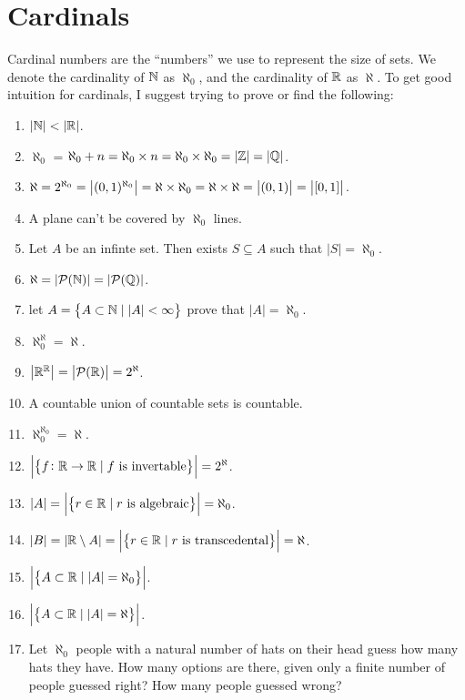 \documentclass[11pt,a4paper]{article}
\begin{document}
\newpage
\section{Cardinals}
Cardinal numbers are the ``numbers'' we use to represent the size of 
sets. We denote the cardinality of $\mathbb{N}$ as $\aleph_0$, and the cardinality
of $\mathbb{R}$ as $\aleph$. To get good intuition for cardinals, I suggest trying 
to prove or find the following:
\begin{enumerate}
    \item $|\mathbb{N}| < |\mathbb{R}|$.
    \item $\aleph_{0}$ = 
    $\aleph_{0} + n = \aleph_0 \times n=\aleph_0\times\aleph_0=|\mathbb{Z}|=|\mathbb{Q}|$.
  \item $\aleph = 2^{\aleph_0} = \left\lvert(0,1)^{\aleph_0}\right\rvert = \aleph\times\aleph_0 
    = \aleph\times\aleph = \left\lvert(0,1)\right\rvert = \left\lvert[0,1]\right\rvert$.
    \item A plane can't be covered by $\aleph_0$ lines.
    \item Let $A$ be an infinte set. Then exists $S \subseteq A$ such
      that $|S| = \aleph_0$.
    \item $\aleph = |\mathcal{P}(\mathbb{N})|= |\mathcal{P}(\mathbb{Q})|$.
    \item let $A = \left\{A \subset \mathbb{N} \mid |A| < \infty\right\}$ prove that
      $|A| = \aleph_0$.
    \item $\aleph^\aleph_0=\aleph$.
    \item $\left\lvert\mathbb{R}^{\mathbb{R}}\right\rvert = \left\lvert\mathcal{P}(\mathbb{R})\right\rvert = 2^\aleph$.
    \item A countable union of countable sets is countable.
    \item $\aleph_0^{\aleph_0} =\aleph$.
    \item $\left\lvert\left\{f \colon \mathbb{R} \to \mathbb{R} \mid f \text{ is invertable}\right\}\right\rvert = 
      2^\aleph$.
    \item $|A| =
      \left\lvert\left\{r \in \mathbb{R} \mid r \text{ is algebraic}\right\}\right\rvert = \aleph_0$.
    \item $|B| = |\mathbb{R} \setminus A| =
      \left\lvert\left\{r \in \mathbb{R} \mid r \text{ is transcedental}\right\}\right\rvert = \aleph$.
    \item $\left\lvert\left\{A \subset \mathbb{R} \mid |A| = \aleph_0\right\}\right\rvert$.
    \item $\left\lvert\left\{A \subset \mathbb{R} \mid |A| = \aleph\right\}\right\rvert$.
    \item Let $\aleph_0$ people with a natural number of hats on their head 
    guess how many hats they have. How many options are there, given only 
    a finite number of people guessed right? How many people guessed wrong?
    
\end{enumerate}
\end{document}
